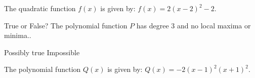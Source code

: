\documentclass[11pt,answers]{exam}
\begin{document}
\begin{questions}


\addpoints

\question The quadratic function $f(x)$ is given by: $\displaystyle f(x) = 2(x-2)^2-2$. 


\question[1] True or False? The polynomial function $P$  has degree 3 and no local maxima or minima..
\begin{oneparchoices}
	\choice Possibly true \choice Impossible
\end{oneparchoices}

\question The polynomial function $Q(x)$ is given by: 
$\displaystyle Q(x) = -2(x-1)^2(x+1)^2$.

\end{questions}
\end{document}
